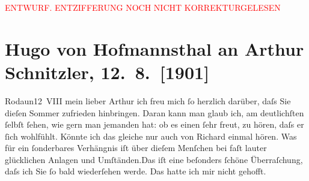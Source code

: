 
\begin{center}
            \textcolor{red}{ENTWURF. ENTZIFFERUNG NOCH NICHT KORREKTURGELESEN}
                      \end{center}
            
               \section[Hugo von Hofmannsthal an Arthur Schnitzler, 12. 8. {[}1901{]}]{ Hugo von Hofmannsthal an Arthur Schnitzler, 12. 8. {[}1901{]}}\nopagebreak{}\rehead{ }\begin{ledgroupsized}[t]{13cm}\normalsize\beginnumbering{} \toendnotes[C]{\smallbreak\pagebreak[2]} 
\toendnotes[C]{\smallbreak}\pstart
           \raggedleft{}{\pb}Rodaun12 VIII\pend
           \pstart{}mein lieber Arthur \pend\pstart
           ich freu mich ſo herzlich darüber, daſs Sie dieſen Sommer zufrieden hinbringen. Daran
               kann man glaub ich, am deutlichſten ſelbſt ſehen, wie gern man jemanden hat: ob es
               einen ſehr freut, zu hören, daſs er ſich wohlfühlt. Könnte ich das gleiche nur auch
               von Richard einmal hören. Was für ein ſonderbares
               Verhängnis iſt über dieſem Menſchen bei faſt lauter glücklichen Anlagen und
                  Umſtänden.\hspace*{1.5em}Das iſt {\pb}eine beſonders ſchöne
               Überraſchung, daſs ich Sie ſo bald wiederſehen werde. Das hatte ich mir nicht
               gehofft.\pend
           \pstart

\end{ledgroupsized}
